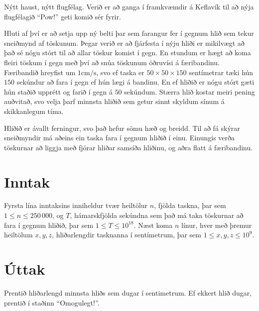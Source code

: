 
Nýtt haust, nýtt flugfélag. Verið er að ganga í framkvæmdir á Keflavík til að nýja flugfélagið ``Pow!'' geti
komið sér fyrir.

Hluti af því er að setja upp ný belti þar sem farangur fer í gegnum hlið sem tekur sneiðmynd
af töskunum. Þegar verið er að fjárfesta í nýju hliði er mikilvægt að það sé nógu stórt til að allar töskur 
komist í gegn. En stundum er hægt að koma fleiri töskum í gegn með því að snúa töskunum öðruvísi á færibandinu.
Færibandið hreyfist um $1 \mathrm{cm/s}$, svo ef taska er $50 \times 50 \times 150$ sentímetrar tæki hún $150$ sekúndur að fara
í gegn ef hún lægi á bandinu. En ef hliðið er nógu stórt gæti hún staðið upprétt og farið í gegn á $50$ sekúndum. 
Stærra hlið kostar meiri pening auðvitað, svo velja þarf minnsta hliðið sem getur sinnt skyldum sínum á skikkanlegum
tíma.

Hliðið er ávallt ferningur, svo það hefur sömu hæð og breidd. Til að fá skýrar sneiðmyndir má aðeins ein taska
fara í gegnum hliðið í einu. Einungis verða töskurnar að liggja með fjórar hliðar samsíða hliðinu, og aðra flatt á færibandinu.

\section*{Inntak}
Fyrsta lína inntaksins inniheldur tvær heiltölur $n$, fjölda taskna, þar sem $1 \leq n \leq 250\,000$, og $T$,
hámarskfjölda sekúndna sem það má taka töskurnar að fara í gegnum hliðið, þar sem $1 \leq T \leq 10^{18}$.
Næst koma $n$ línur, hver með þremur heiltölum $x, y, z$,
hliðarlengdir tasknanna í sentímetrum, þar sem $1 \leq x, y, z \leq 10^9$.

\section*{Úttak}
Prentið hliðarlengd minnsta hliðs sem dugar í sentimetrum. Ef ekkert hlið dugar, prentið í staðinn ``Omogulegt!''.
